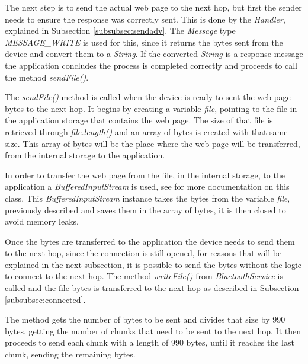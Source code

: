 The next step is to send the actual web page to the next hop, but first the sender needs to ensure the response was correctly sent. This is done by the \textit{Handler}, explained in Subsection \ref{subsubsec:sendadv}. The \textit{Message} type \textit{MESSAGE\_WRITE} is used for this, since it returns the bytes sent from the device and convert them to a \textit{String}. If the converted \textit{String} is a response message the application concludes the process is completed correctly and proceeds to call the method \textit{sendFile()}.

The \textit{sendFile()} method is called when the device is ready to sent the web page bytes to the next hop. It begins by creating a variable \textit{file}, pointing to the file in the application storage that contains the web page. The size of that file is retrieved through \textit{file.length()} and an array of bytes is created with that same size. This array of bytes will be the place where the web page will be transferred, from the internal storage to the application.

In order to transfer the web page from the file, in the internal storage, to the application a \textit{BufferedInputStream} is used, see \cite{bis} for more documentation on this class. This \textit{BufferedInputStream} instance takes the bytes from the variable \textit{file}, previously described and saves them in the array of bytes, it is then closed to avoid memory leaks.

Once the bytes are transferred to the application the device needs to send them to the next hop, since the connection is still opened, for reasons that will be explained in the next subsection, it is possible to send the bytes without the logic to connect to the next hop. The method \textit{writeFile()} from \textit{BluetoothService} is called and the file bytes is transferred to the next hop as described in Subsection \ref{subsubsec:connected}.

The method gets the number of bytes to be sent and divides that size by 990 bytes, getting the number of chunks that need to be sent to the next hop. It then proceeds to send each chunk with a length of 990 bytes, until it reaches the last chunk, sending the remaining bytes.

